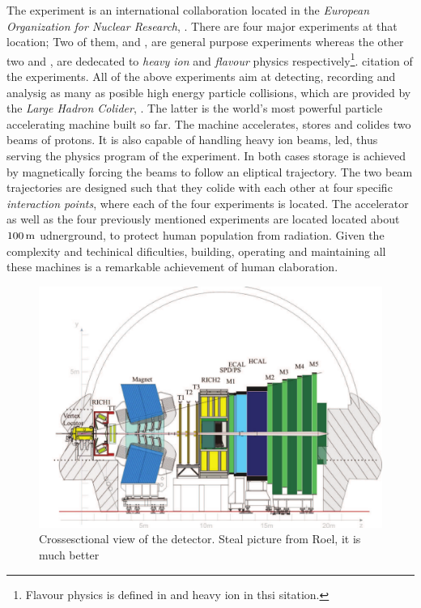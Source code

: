 
The \lhcb experiment is an international collaboration located in the {\it European Organization for Nuclear Research}, \cern.
There are four major experiments at that location; Two of them, \atlas and \cms, are general purpose experiments whereas the other
two \alice and \lhcb, are dedecated to {\it heavy ion} and {\it flavour} physics respectively\footnote{\color{red} Flavour physics is  defined in and heavy ion in thsi sitation.}.
{\color{red} citation of the experiments}. All of the above experiments aim at detecting, recording and analysig as many as
posible high energy particle collisions, which are provided by the {\it Large Hadron Colider}, \lhc.
The latter is the world's most powerful particle accelerating machine built so far.
The \lhc machine accelerates, stores and colides two beams of protons. It is also capable of handling
heavy ion beams, \eg led, thus serving the physics program of the \alice experiment.
In both cases storage is achieved by magnetically forcing the beams to follow an eliptical trajectory.
The two beam trajectories are designed such that they colide with each other at four specific {\it interaction points},
where each of the four experiments is located. The \lhc accelerator as well as the four previously mentioned
experiments are located located about $100\rm \,m$ udnerground, to protect human population from radiation.
Given the complexity and techinical dificulties, building, operating and maintaining all these machines
is a remarkable achievement of human claboration.

\begin{figure}[t]
  \centering
  \includegraphics[width=\textwidth]{Figures/Chapter2/detector_cross_cmyk}
  \caption{Crossesctional view of the \lhcb detector. {\color{red} Steal picture from Roel, it is much better}}
  \label{lhcb_detector_cross_section}
\end{figure}

